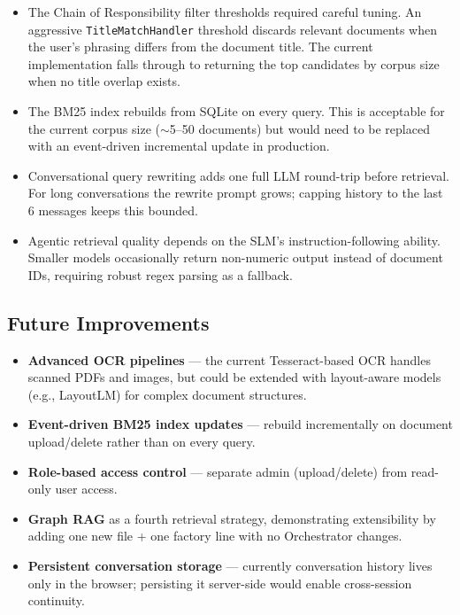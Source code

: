 \documentclass[11pt,a4paper]{article}
\begin{document}
\begin{itemize}
    \item The Chain of Responsibility filter thresholds required careful tuning. An aggressive \texttt{TitleMatchHandler} threshold discards relevant documents when the user's phrasing differs from the document title. The current implementation falls through to returning the top candidates by corpus size when no title overlap exists.
    \item The BM25 index rebuilds from SQLite on every query. This is acceptable for the current corpus size ($\sim$5--50 documents) but would need to be replaced with an event-driven incremental update in production.
    \item Conversational query rewriting adds one full LLM round-trip before retrieval. For long conversations the rewrite prompt grows; capping history to the last 6 messages keeps this bounded.
    \item Agentic retrieval quality depends on the SLM's instruction-following ability. Smaller models occasionally return non-numeric output instead of document IDs, requiring robust regex parsing as a fallback.
\end{itemize}

\subsection{Future Improvements}

\begin{itemize}
    \item \textbf{Advanced OCR pipelines} --- the current Tesseract-based OCR handles scanned PDFs and images, but could be extended with layout-aware models (e.g., LayoutLM) for complex document structures.
    \item \textbf{Event-driven BM25 index updates} --- rebuild incrementally on document upload/delete rather than on every query.
    \item \textbf{Role-based access control} --- separate admin (upload/delete) from read-only user access.
    \item \textbf{Graph RAG} as a fourth retrieval strategy, demonstrating extensibility by adding one new file + one factory line with no Orchestrator changes.
    \item \textbf{Persistent conversation storage} --- currently conversation history lives only in the browser; persisting it server-side would enable cross-session continuity.
\end{itemize}
\end{document}
